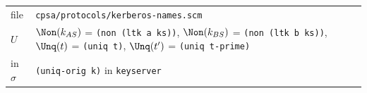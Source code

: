 \par\smallskip\noindent\begin{tabular}{@{}l p{}@{}}
file & \texttt{cpsa/protocols/kerberos-names.scm}\\
$U$ & $\Non(k_{AS})$ = \texttt{(non (ltk a ks))}, $\Non(k_{BS})$ = \texttt{(non (ltk b ks))}, $\Unq(t)$ = \texttt{(uniq t)}, $\Unq(t')$ = \texttt{(uniq t-prime)}\\
in $\sigma$ & \texttt{(uniq-orig k)} in \texttt{keyserver}\\
\end{tabular}

